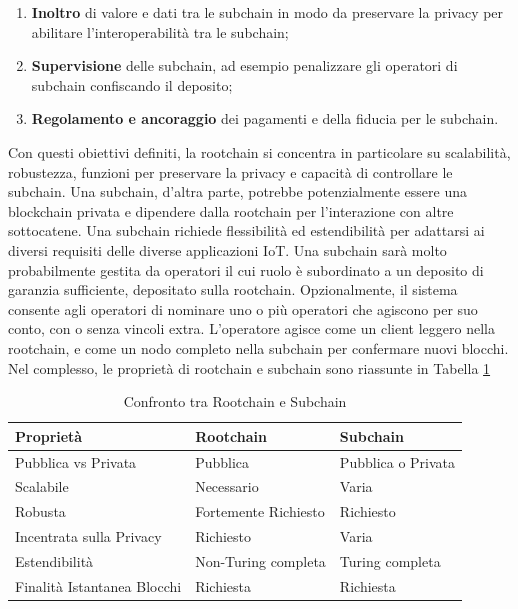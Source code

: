 \documentclass[a4paper,12pt]{article}
\begin{document}
\begin{enumerate}
	\item
	      \textbf{Inoltro} di valore e dati tra le subchain in modo da preservare la privacy per abilitare l'interoperabilità tra le subchain;
	\item
	      \textbf{Supervisione} delle subchain, ad esempio penalizzare gli operatori di subchain confiscando il deposito;
	\item
	      \textbf{Regolamento e ancoraggio} dei pagamenti e della fiducia per le subchain.
\end{enumerate}
Con questi obiettivi definiti, la rootchain si concentra in particolare su scalabilità, robustezza,
funzioni per preservare la privacy e capacità di controllare le subchain.
Una subchain, d'altra parte, potrebbe potenzialmente essere una blockchain privata e dipendere dalla rootchain per l'interazione con altre sottocatene. Una subchain richiede flessibilità
ed estendibilità per adattarsi ai diversi requisiti delle diverse applicazioni IoT. Una subchain sarà molto probabilmente gestita da operatori il cui ruolo è subordinato a un deposito di garanzia sufficiente, depositato sulla rootchain. Opzionalmente, il sistema consente agli operatori di nominare uno o più operatori che agiscono per suo conto, con o senza vincoli extra. L'operatore agisce come un client leggero nella rootchain, e come un nodo completo nella subchain per
confermare nuovi blocchi.
Nel complesso, le proprietà di rootchain e subchain sono riassunte in Tabella \ref{table:rootchainandsubchains}

\begin{table}[tp]%
	\caption{Confronto tra Rootchain e Subchain}
	\label{table:rootchainandsubchains}\centering %
	\begin{tabular}{l|l|l}
		\hline
		\textbf{Proprietà}          & \textbf{Rootchain}   & \textbf{Subchain}  \\
		\hline
		Pubblica vs Privata         & Pubblica             & Pubblica o Privata \\
		Scalabile                   & Necessario           & Varia              \\
		Robusta                     & Fortemente Richiesto & Richiesto          \\
		Incentrata sulla Privacy    & Richiesto            & Varia              \\
		Estendibilità               & Non-Turing completa  & Turing completa    \\
		Finalità Istantanea Blocchi & Richiesta            & Richiesta          \\
		\hline
	\end{tabular}
\end{table}
\end{document}

